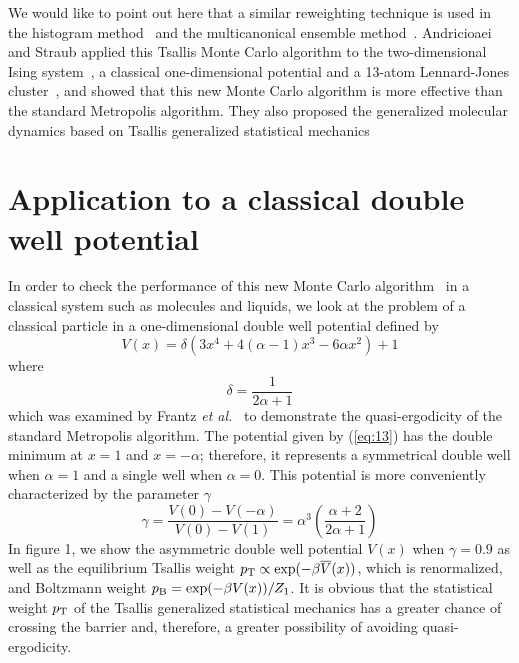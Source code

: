 We would like to point out here that a similar reweighting
technique is used in the histogram method~\cite{FS} and
the multicanonical ensemble method~\cite{BN}. Andricioaei and
Straub applied this Tsallis Monte Carlo algorithm to the
two-dimensional Ising system~\cite{AS2}, a classical one-dimensional
potential and a 13-atom Lennard-Jones cluster~\cite{AS3}, and
showed that this new Monte Carlo algorithm is more effective
than the standard Metropolis algorithm. They also proposed the
generalized molecular dynamics based on Tsallis generalized statistical
mechanics~\cite{AS3,SA}

\section{Application to a classical double well potential}

In order to check the performance of this new Monte Carlo
algorithm~\cite{AS2,AS3} in a classical system such as molecules
and liquids, we look at the problem of a classical particle
in a one-dimensional double well potential defined by
\begin{equation}
V(x)=\delta\left(3 x^{4}+4(\alpha-1)x^{3}-6\alpha x^{2}\right)+1
\label{eq:13}
\end{equation}
where
\begin{equation}
\delta=\frac{1}{2\alpha+1}
\label{eq:14}
\end{equation}
which was examined by Frantz {\it et al.}~\cite{FFD} to demonstrate
the quasi-ergodicity of the standard Metropolis algorithm. The
potential given by (\ref{eq:13}) has the double minimum at $x=1$
and $x=-\alpha$; therefore, it represents a symmetrical double well
when $\alpha=1$ and a single well when $\alpha=0$. This potential
is more conveniently characterized by the parameter $\gamma$~\cite{FFD}
\begin{equation}
\gamma=\frac{V(0)-V(-\alpha)}{V(0)-V(1)}
=\alpha^{3}\left(\frac{\alpha+2}{2\alpha+1}\right)
\label{eq:15}
\end{equation}
In figure 1, we show the asymmetric double well potential $V(x)$
when $\gamma=0.9$ as well as the equilibrium Tsallis weight
$p_{\rm T}\propto \exp(-\beta \overline{V}(x))$, which is renormalized,
and Boltzmann weight $p_{\rm B}=\exp(-\beta V(x))/Z_{1}$. It is obvious
that the statistical weight $p_{\rm T}$ of the Tsallis generalized
statistical mechanics has a greater chance of crossing the barrier
and, therefore, a greater possibility of avoiding quasi-ergodicity.


